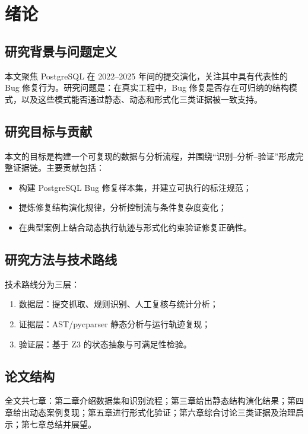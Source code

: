 \chapter{绪论}\label{chap:intro}

\section{研究背景与问题定义}
本文聚焦 PostgreSQL 在 2022--2025 年间的提交演化，关注其中具有代表性的 Bug 修复行为。研究问题是：在真实工程中，Bug 修复是否存在可归纳的结构模式，以及这些模式能否通过静态、动态和形式化三类证据被一致支持。

\section{研究目标与贡献}
本文的目标是构建一个可复现的数据与分析流程，并围绕“识别--分析--验证”形成完整证据链。主要贡献包括：
\begin{itemize}
    \item 构建 PostgreSQL Bug 修复样本集，并建立可执行的标注规范；
    \item 提炼修复结构演化规律，分析控制流与条件复杂度变化；
    \item 在典型案例上结合动态执行轨迹与形式化约束验证修复正确性。
\end{itemize}

\section{研究方法与技术路线}
技术路线分为三层：
\begin{enumerate}
    \item 数据层：提交抓取、规则识别、人工复核与统计分析；
    \item 证据层：AST/pycparser 静态分析与运行轨迹复现；
    \item 验证层：基于 Z3 的状态抽象与可满足性检验。
\end{enumerate}

\section{论文结构}
全文共七章：第二章介绍数据集和识别流程；第三章给出静态结构演化结果；第四章给出动态案例复现；第五章进行形式化验证；第六章综合讨论三类证据及治理启示；第七章总结并展望。
